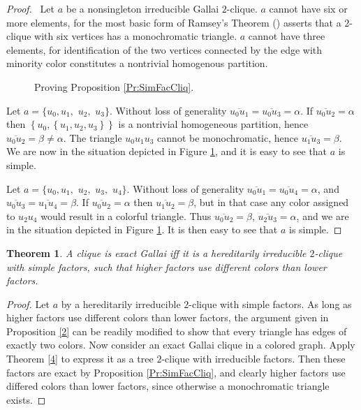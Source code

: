 \documentclass[12pt]{amsart}
\newtheorem{theorem}{Theorem}[section]
\theoremstyle{plain}
\numberwithin{equation}{section}
\begin{document}
\begin{proof}
\ Let $a$ be a nonsingleton irreducible Gallai $2$-clique. $a$ cannot have six
or more elements, for the most basic form of Ramsey's Theorem
(\cite{Ramsey:1930}) asserts that a $2$-clique with six vertices has a
monochromatic triangle. $a$ cannot have three elements, for identification of
the two vertices connected by the edge with minority color constitutes a
nontrivial homogenous partition.

\setlength{\unitlength}{1.2mm}
\begin{figure}[th]
\begin{center}



\end{center}
\caption{Proving Proposition \ref{Pr:SimFacCliq}.}\label{Fg:45}
\end{figure}

Let $a=\{u_{0},u_{1},$ $u_{2},$ $u_{3}\}$. Without loss of generality
$\overline{u_{0}u_{1}}=\overline{u_{0}u_{3}}=\alpha$. If
$\overline{u_{0}u_{2}}=\alpha$ then $\left\{  u_{0},\left\{
u_{1},u_{2},u_{3}\right\} \right\}  $ is a nontrivial homogeneous partition,
hence $\overline{u_{0}u_{2}}=\beta\neq\alpha$. The triangle $u_{0}u_{1}u_{3}$
cannot be monochromatic, hence $\overline{u_{1}u_{3}}=\beta$. We are now in the
situation depicted in Figure \ref{Fg:45}, and it is easy to see that $a$ is
simple.

Let $a=\{u_{0},u_{1},$ $u_{2},$ $u_{3},$ $u_{4}\}$. Without loss of generality
$\overline{u_{0}u_{1}}=\overline{u_{0}u_{4}}=\alpha$, and $\overline
{u_{0}u_{3}}=\overline{u_{1}u_{4}}=\beta$. If $\overline{u_{0}u_{2}}=\alpha$
then $\overline{u_{1}u_{2}}=\beta$, but in that case any color assigned to
$u_{2}u_{4}$ would result in a colorful triangle. Thus
$\overline{u_{0}u_{2}}=\beta$, $\overline{u_{2}u_{3}}=\alpha$, and we are in
the situation depicted in Figure \ref{Fg:45}. It is then easy to see that $a$
is simple.
\end{proof}

\begin{theorem}
\label{Thm:ExGall}A clique is exact Gallai iff it is a hereditarily
irreducible $2$-clique with simple factors, such that higher factors use
different colors than lower factors.
\end{theorem}

\begin{proof}
Let $a$ by a hereditarily irreducible $2$-clique with simple factors. As long
as higher factors use different colors than lower factors, the argument given
in Proposition \ref{2} can be readily modified to show that every triangle has
edges of exactly two colors. Now consider an exact Gallai clique in a colored
graph. Apply Theorem \ref{4} to express it as a tree $2$-clique with
irreducible factors. Then these factors are exact by Proposition
\ref{Pr:SimFacCliq}, and clearly higher factors use differed colors than lower
factors, since otherwise a monochromatic triangle exists.
\end{proof}
\end{document}
